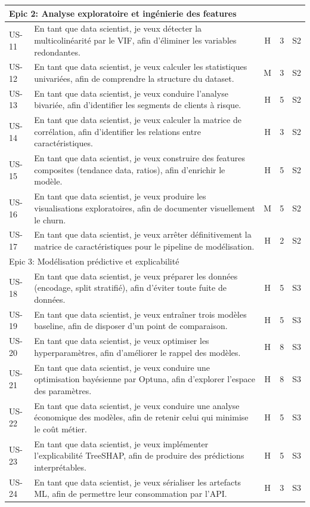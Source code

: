\begin{footnotesize}
\begin{longtable}{|p{1.2cm}|p{8.5cm}|c|c|c|}
\multicolumn{5}{|l|}{Epic 2: Analyse exploratoire et ingénierie des features} \\
\hline
US-11 & En tant que data scientist, je veux détecter la multicolinéarité par le VIF, afin d'éliminer les variables redondantes. & H & 3 & S2 \\
\hline
US-12 & En tant que data scientist, je veux calculer les statistiques univariées, afin de comprendre la structure du dataset. & M & 3 & S2 \\
\hline
US-13 & En tant que data scientist, je veux conduire l'analyse bivariée, afin d'identifier les segments de clients à risque. & H & 5 & S2 \\
\hline
US-14 & En tant que data scientist, je veux calculer la matrice de corrélation, afin d'identifier les relations entre caractéristiques. & H & 3 & S2 \\
\hline
US-15 & En tant que data scientist, je veux construire des features composites (tendance data, ratios), afin d'enrichir le modèle. & H & 5 & S2 \\
\hline
US-16 & En tant que data scientist, je veux produire les visualisations exploratoires, afin de documenter visuellement le churn. & M & 5 & S2 \\
\hline
US-17 & En tant que data scientist, je veux arrêter définitivement la matrice de caractéristiques pour le pipeline de modélisation. & H & 2 & S2 \\
\hline

\multicolumn{5}{|l|}{Epic 3: Modélisation prédictive et explicabilité} \\
\hline
US-18 & En tant que data scientist, je veux préparer les données (encodage, split stratifié), afin d'éviter toute fuite de données. & H & 5 & S3 \\
\hline
US-19 & En tant que data scientist, je veux entraîner trois modèles baseline, afin de disposer d'un point de comparaison. & H & 5 & S3 \\
\hline
US-20 & En tant que data scientist, je veux optimiser les hyperparamètres, afin d'améliorer le rappel des modèles. & H & 8 & S3 \\
\hline
US-21 & En tant que data scientist, je veux conduire une optimisation bayésienne par Optuna, afin d'explorer l'espace des paramètres. & H & 8 & S3 \\
\hline
US-22 & En tant que data scientist, je veux conduire une analyse économique des modèles, afin de retenir celui qui minimise le coût métier. & H & 5 & S3 \\
\hline
US-23 & En tant que data scientist, je veux implémenter l'explicabilité TreeSHAP, afin de produire des prédictions interprétables. & H & 5 & S3 \\
\hline
US-24 & En tant que data scientist, je veux sérialiser les artefacts ML, afin de permettre leur consommation par l'API. & H & 3 & S3 \\
\hline


\end{longtable}
\end{footnotesize}
